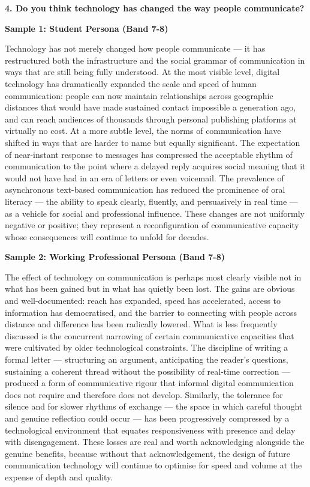 \separator

\begin{ieltsquestion}
\textbf{4. Do you think technology has changed the way people communicate?}
\end{ieltsquestion}
\textbf{Sample 1: Student Persona (Band 7-8)}

Technology has not merely changed how people communicate — it has restructured both the infrastructure and the social grammar of communication in ways that are still being fully understood. At the most visible level, digital technology has dramatically expanded the scale and speed of human communication: people can now maintain relationships across geographic distances that would have made sustained contact impossible a generation ago, and can reach audiences of thousands through personal publishing platforms at virtually no cost. At a more subtle level, the norms of communication have shifted in ways that are harder to name but equally significant. The expectation of near-instant response to messages has compressed the acceptable rhythm of communication to the point where a delayed reply acquires social meaning that it would not have had in an era of letters or even voicemail. The prevalence of asynchronous text-based communication has reduced the prominence of oral literacy — the ability to speak clearly, fluently, and persuasively in real time — as a vehicle for social and professional influence. These changes are not uniformly negative or positive; they represent a reconfiguration of communicative capacity whose consequences will continue to unfold for decades.

\textbf{Sample 2: Working Professional Persona (Band 7-8)}

The effect of technology on communication is perhaps most clearly visible not in what has been gained but in what has quietly been lost. The gains are obvious and well-documented: reach has expanded, speed has accelerated, access to information has democratised, and the barrier to connecting with people across distance and difference has been radically lowered. What is less frequently discussed is the concurrent narrowing of certain communicative capacities that were cultivated by older technological constraints. The discipline of writing a formal letter — structuring an argument, anticipating the reader's questions, sustaining a coherent thread without the possibility of real-time correction — produced a form of communicative rigour that informal digital communication does not require and therefore does not develop. Similarly, the tolerance for silence and for slower rhythms of exchange — the space in which careful thought and genuine reflection could occur — has been progressively compressed by a technological environment that equates responsiveness with presence and delay with disengagement. These losses are real and worth acknowledging alongside the genuine benefits, because without that acknowledgement, the design of future communication technology will continue to optimise for speed and volume at the expense of depth and quality.

